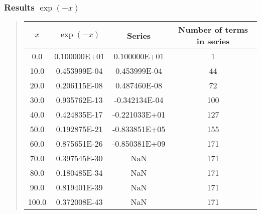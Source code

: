 \documentclass{beamer}
\newenvironment{block_mdfboxadmon}[1][]{\begin{block}{#1}}{\end{block}}
\begin{document}
\begin{frame}
\frametitle{Results $\exp{(-x)}$}

\begin{block_mdfboxadmon}


\begin{quote}
\begin{tabular}{cccc}
\hline
\multicolumn{1}{c}{ $x$ } & \multicolumn{1}{c}{ $\exp{(-x)}$ } & \multicolumn{1}{c}{ Series } & \multicolumn{1}{c}{ Number of terms in series } \\
\hline
0.0                       & 0.100000E+01              & 0.100000E+01              & 1                         \\
10.0                      & 0.453999E-04              & 0.453999E-04              & 44                        \\
20.0                      & 0.206115E-08              & 0.487460E-08              & 72                        \\
30.0                      & 0.935762E-13              & -0.342134E-04             & 100                       \\
40.0                      & 0.424835E-17              & -0.221033E+01             & 127                       \\
50.0                      & 0.192875E-21              & -0.833851E+05             & 155                       \\
60.0                      & 0.875651E-26              & -0.850381E+09             & 171                       \\
70.0                      & 0.397545E-30              & NaN                       & 171                       \\
80.0                      & 0.180485E-34              & NaN                       & 171                       \\
90.0                      & 0.819401E-39              & NaN                       & 171                       \\
100.0                     & 0.372008E-43              & NaN                       & 171                       \\
\hline
\end{tabular}
\end{quote}

\noindent
\end{block_mdfboxadmon}
\end{frame}
\end{document}

